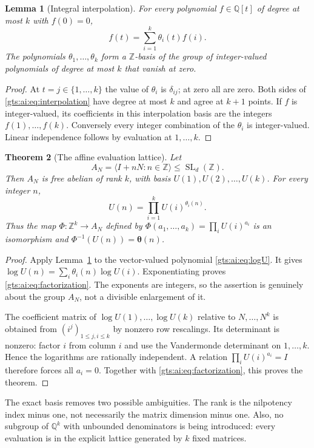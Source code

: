 \documentclass[11pt,letterpaper]{article}
\newtheorem{theorem}{Theorem}[section]
\newtheorem{lemma}[theorem]{Lemma}
\theoremstyle{definition}
\theoremstyle{remark}
\newcommand{\Z}{\mathbb Z}
\newcommand{\SL}{\operatorname{SL}}
\newcommand{\Q}{\mathbb Q}
\newcommand{\vv}{\boldsymbol\theta}
\begin{document}
\begin{lemma}[Integral interpolation]\label{gts:ai:lem:interpolation}
For every polynomial $f\in\Q[t]$ of degree at most $k$ with $f(0)=0$,
\begin{equation}\label{gts:ai:eq:interpolation}
 f(t)=\sum_{i=1}^k\theta_i(t)f(i).
\end{equation}
The polynomials $\theta_1,\ldots,\theta_k$ form a $\Z$-basis of the group of integer-valued polynomials of degree at most $k$ that vanish at zero.
\end{lemma}
\begin{proof}
At $t=j\in\{1,\ldots,k\}$ the value of $\theta_i$ is $\delta_{ij}$; at zero all are zero. Both sides of \eqref{gts:ai:eq:interpolation} have degree at most $k$ and agree at $k+1$ points. If $f$ is integer-valued, its coefficients in this interpolation basis are the integers $f(1),\ldots,f(k)$. Conversely every integer combination of the $\theta_i$ is integer-valued. Linear independence follows by evaluation at $1,\ldots,k$.
\end{proof}
\begin{theorem}[The affine evaluation lattice]\label{gts:ai:thm:freebasis}
Let
\[
 A_N=\langle I+nN:n\in\Z\rangle\le\SL_d(\Z).
\]
Then $A_N$ is free abelian of rank $k$, with basis
$U(1),U(2),\ldots,U(k)$. For every integer $n$,
\begin{equation}\label{gts:ai:eq:factorization}
 U(n)=\prod_{i=1}^k U(i)^{\theta_i(n)}.
\end{equation}
Thus the map $\Phi:\Z^k\to A_N$ defined by
$\Phi(a_1,\ldots,a_k)=\prod_iU(i)^{a_i}$ is an isomorphism and
$\Phi^{-1}(U(n))=\vv(n)$.
\end{theorem}
\begin{proof}
Apply Lemma~\ref{gts:ai:lem:interpolation} to the vector-valued polynomial \eqref{gts:ai:eq:logU}. It gives
$\log U(n)=\sum_i\theta_i(n)\log U(i)$. Exponentiating proves \eqref{gts:ai:eq:factorization}. The exponents are integers, so the assertion is genuinely about the group $A_N$, not a divisible enlargement of it.

The coefficient matrix of $\log U(1),\ldots,\log U(k)$ relative to $N,\ldots,N^k$ is obtained from $(i^j)_{1\le j,i\le k}$ by nonzero row rescalings. Its determinant is nonzero: factor $i$ from column $i$ and use the Vandermonde determinant on $1,\ldots,k$. Hence the logarithms are rationally independent. A relation $\prod_iU(i)^{a_i}=I$ therefore forces all $a_i=0$. Together with \eqref{gts:ai:eq:factorization}, this proves the theorem.
\end{proof}
The exact basis removes two possible ambiguities. The rank is the nilpotency index minus one, not necessarily the matrix dimension minus one. Also, no subgroup of $\Q^k$ with unbounded denominators is being introduced: every evaluation is in the explicit lattice generated by $k$ fixed matrices.
\end{document}
